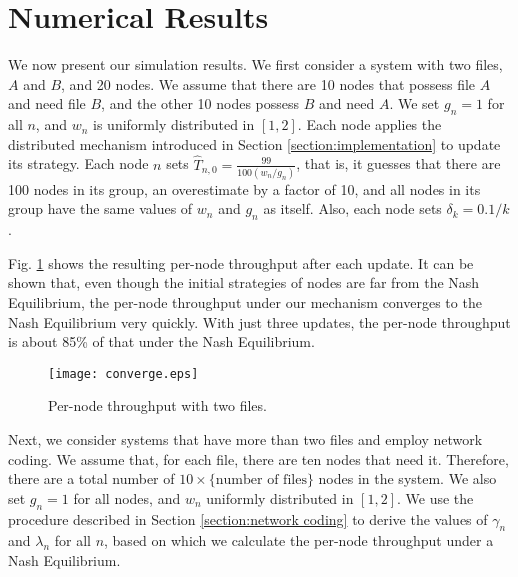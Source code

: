 \documentclass[11pt, conference]{IEEEtran}
\begin{document}
\section{Numerical Results} \label{section:numerical}

We now present our simulation results. We first consider a system with two files, $A$ and $B$, and 20 nodes. We assume that there are 10 nodes that possess file $A$ and need file $B$, and the other 10 nodes possess $B$ and need $A$. We set $g_n=1$ for all $n$, and $w_n$ is uniformly distributed in $[1,2]$. Each node applies the distributed mechanism introduced in Section \ref{section:implementation} to update its strategy. Each node $n$ sets $\hat{T}_{n,0}=\frac{99}{100(w_n/g_n)}$, that is, it guesses that there are 100 nodes in its group, an overestimate by a factor of 10, and all nodes in its group have the same values of $w_n$ and $g_n$ as itself. Also, each node sets $\delta_k=0.1/k$.

Fig. \ref{fig:numerical:converge} shows the resulting per-node throughput after each update. It can be shown that, even though the initial strategies of nodes are far from the Nash Equilibrium, the per-node throughput under our mechanism converges to the Nash Equilibrium very quickly. With just three updates, the per-node throughput is about 85\% of that under the Nash Equilibrium.

\begin{figure}[t]
\texttt{[image: converge.eps]}
\caption{Per-node throughput with two files.} \label{fig:numerical:converge}
\end{figure}







Next, we consider systems that have more than two files and employ network coding. We assume that, for each file, there are ten nodes that need it. Therefore, there are a total number of $10\times\{\mbox{number of files}\}$ nodes in the system. We also set $g_n=1$ for all nodes, and $w_n$ uniformly distributed in $[1,2]$. We use the procedure described in Section \ref{section:network coding} to derive the values of $\gamma_n$ and $\lambda_n$ for all $n$, based on which we calculate the per-node throughput under a Nash Equilibrium.
\end{document}
